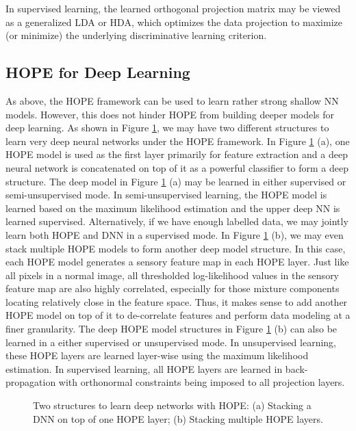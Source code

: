 \documentclass[11pt]{article}
\begin{document}
In supervised learning, the learned orthogonal projection matrix  may be viewed as a generalized LDA or HDA\cite{Kumar98}, which optimizes the data projection to maximize (or minimize) the underlying discriminative learning criterion. 

\subsection{HOPE for Deep Learning}

As above, the HOPE framework can be used to learn rather strong shallow NN models. However, this does not hinder HOPE from building deeper models for deep learning. As shown in Figure \ref{fg-DNN-Hope-Layers}, we may have two different structures to learn very deep neural networks under the HOPE framework. In Figure \ref{fg-DNN-Hope-Layers} (a), one HOPE model is used as the first layer primarily for feature extraction and a deep neural network is concatenated on top of it as a powerful classifier to form a deep structure. 
The deep model in Figure \ref{fg-DNN-Hope-Layers} (a) may be learned in either supervised or semi-unsupervised mode. In semi-unsupervised learning, the HOPE model is learned based on the maximum likelihood estimation and the upper deep NN is learned supervised. Alternatively, if we have enough labelled data, we may jointly learn both HOPE and DNN in a supervised mode.
In Figure \ref{fg-DNN-Hope-Layers} (b), we may even stack multiple HOPE models to form another deep model structure. In this case, each HOPE model generates a sensory feature map in each HOPE layer. Just like all pixels in a normal image, all thresholded log-likelihood values in the sensory feature map are also highly correlated, especially for those mixture components locating relatively close in the feature space. Thus, it makes sense to add another HOPE model on top of it to de-correlate features and perform data modeling at a finer granularity. 
The deep HOPE model structures in Figure \ref{fg-DNN-Hope-Layers}  (b)
can also be learned in a either supervised or unsupervised mode. In unsupervised learning, these HOPE layers are learned layer-wise using the maximum likelihood estimation. In supervised learning, all HOPE layers are learned in back-propagation with orthonormal constraints being imposed to all projection layers. 

\begin{figure}[h]       
    \hspace{20px}
    \caption{Two structures to learn deep networks with HOPE: (a) Stacking a DNN on top of one HOPE layer; (b) Stacking multiple HOPE layers. }
    \label{fg-DNN-Hope-Layers}
\end{figure}
\end{document}
